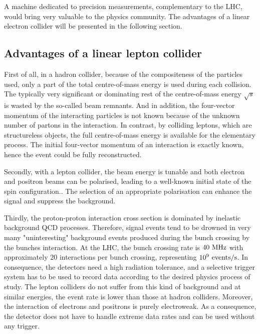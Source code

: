   A machine dedicated to precision measurements, complementary to the \gls{LHC}, would bring very valuable to the physics community.
  The advantages of a linear electron collider will be presented in the following section.

    \subsection{Advantages of a linear lepton collider}
    \label{subsec:advLLC}
    
    First of all, in a hadron collider, because of the compositeness of the particles used, only a part of the total centre-of-mass energy is used during each collision.
    The typically very significant or dominating rest of the centre-of-mass energy $\sqrt{s}$ is wasted by the so-called beam remnants. 
    And in addition, the four-vector momentum  of the interacting particles is not known because of the unknown number of partons in the interaction.
    In contrast, by colliding leptons, which are structureless objects, the full centre-of-mass energy is available for the elementary process. 
    The initial four-vector momentum of an interaction is exactly known, hence the event could be fully reconstructed.

    Secondly, with a lepton collider, the beam energy is tunable and both electron and positron beams can be polarised, leading to a well-known initial state of the spin configuration.. 
    The selection of an appropriate polarisation can enhance the signal and suppress the background. 

    Thirdly, the proton-proton interaction cross section is dominated by inelastic background QCD processes.
    Therefore, signal events tend to be drowned in very many "uninteresting" background events produced during the bunch crossing by the bunches interaction.
    At the \gls{LHC}, the bunch crossing rate is $40~\rm{MHz}$ with approximately $20$ interactions per bunch crossing, representing $10^9~\rm{events/s}$.
    In consequence, the detectors need a high radiation tolerance, and a selective trigger system has to be used to record data according to the desired physics process of study.
    The lepton colliders do not suffer from this kind of background and at similar energies, the event rate is lower than those at hadron colliders.
    Moreover, the interaction of electrons and positrons is purely electroweak.
    As a consequence, the detector does not have to handle extreme data rates and can be used without any trigger.

